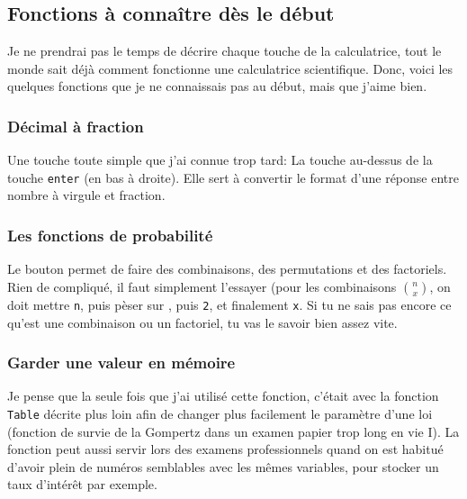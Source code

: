 \subsection{Fonctions à connaître dès le début}
\label{sec:fonctiondebut}

Je ne prendrai pas le temps de décrire chaque touche de la calculatrice, tout le monde sait déjà comment fonctionne une calculatrice scientifique. Donc, voici les quelques fonctions que je ne connaissais pas au début, mais que j'aime bien.

\subsubsection{Décimal à fraction}
Une touche toute simple que j'ai connue trop tard: La touche  %
au-dessus de la touche \texttt{enter} (en bas à droite). Elle sert à convertir le format d'une réponse entre nombre à virgule et fraction.

\subsubsection{Les fonctions de probabilité}
Le bouton  permet de faire des combinaisons, des permutations et des factoriels. Rien de compliqué, il faut simplement l'essayer (pour les combinaisons ${n \choose x}$, on doit mettre \texttt{n}, puis pèser sur , puis \texttt{2}, et finalement \texttt{x}. Si tu ne sais pas encore ce qu'est une combinaison ou un factoriel, tu vas le savoir bien assez vite.

\subsubsection{Garder une valeur en mémoire}
Je pense que la seule fois que j'ai utilisé cette fonction, c'était avec la fonction \texttt{Table} décrite plus loin afin de changer plus facilement le paramètre d'une loi (fonction de survie de la Gompertz dans un examen papier trop long en vie I). La fonction peut aussi servir lors des examens professionnels quand on est habitué d'avoir plein de numéros semblables avec les mêmes variables, pour stocker un taux d'intérêt par exemple.

